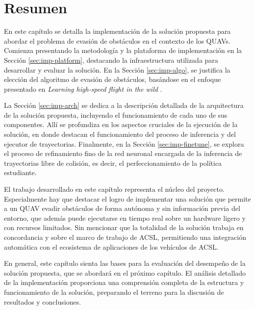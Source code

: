 \section{Resumen}

En este capítulo se detalla la implementación de la solución propuesta para abordar el problema de evasión de obstáculos en el contexto de los QUAVs. Comienza presentando la metodología y la plataforma de implementación en la Sección \ref{sec:imp-platform}, destacando la infraestructura utilizada para desarrollar y evaluar la solución. En la Sección \ref{sec:imp-algo}, se justifica la elección del algoritmo de evasión de obstáculos, basándose en el enfoque presentado en \textit{Learning high-speed flight in the wild} \cite{Loquercio2021}.

La Sección \ref{sec:imp-arch} se dedica a la descripción detallada de la arquitectura de la solución propuesta, incluyendo el funcionamiento de cada uno de sus componentes. Allí se profundiza en los aspectos cruciales de la ejecución de la solución, en donde destacan el funcionamiento del proceso de inferencia y del ejecutor de trayectorias. Finalmente, en la Sección \ref{sec:imp-finetune}, se explora el proceso de refinamiento fino de la red neuronal encargada de la inferencia de trayectorias libre de colisión, es decir, el perfeccionamiento de la política estudiante.

El trabajo desarrollado en este capítulo representa el núcleo del proyecto. Especialmente hay que destacar el logro de implementar una solución que permite a un QUAV evadir obstáculos de forma autónoma y sin información previa del entorno, que además puede ejecutarse en tiempo real sobre un hardware ligero y con recursos limitados. Sin mencionar que la totalidad de la solución trabaja en concordancia y sobre el marco de trabajo de ACSL, permitiendo una integración automática con el ecosistema de aplicaciones de los vehículos de ACSL.

En general, este capítulo sienta las bases para la evaluación del desempeño de la solución propuesta, que se abordará en el próximo capítulo. El análisis detallado de la implementación proporciona una comprensión completa de la estructura y funcionamiento de la solución, preparando el terreno para la discusión de resultados y conclusiones.